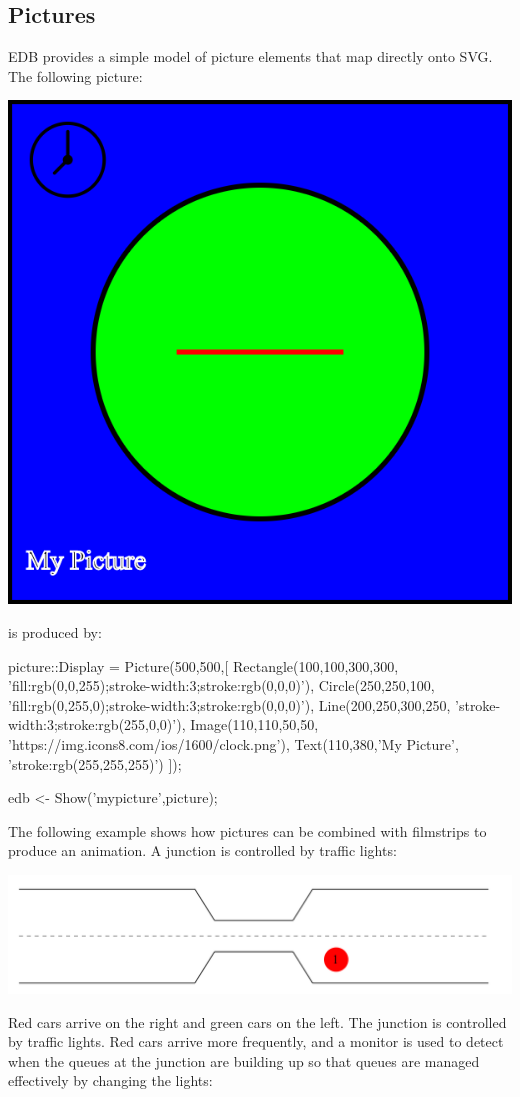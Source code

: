 \documentclass[5p,times]{elsarticle}
\begin{document}
\subsection{Pictures}

\label{sec:picture}

EDB provides a simple model of picture elements that map directly onto SVG. The following picture:
\begin{center}
\includegraphics[width=0.6\columnwidth]{picture}
\end{center}
is produced by:
\begin{ESL}
picture::Display = Picture(500,500,[
  Rectangle(100,100,300,300,
    'fill:rgb(0,0,255);stroke-width:3;stroke:rgb(0,0,0)'),
  Circle(250,250,100,
    'fill:rgb(0,255,0);stroke-width:3;stroke:rgb(0,0,0)'),
  Line(200,250,300,250,
    'stroke-width:3;stroke:rgb(255,0,0)'),
  Image(110,110,50,50,
    'https://img.icons8.com/ios/1600/clock.png'),
  Text(110,380,'My Picture',
    'stroke:rgb(255,255,255)')
]);

edb <- Show('mypicture',picture);
\end{ESL}
The following example shows how pictures can be combined with filmstrips to produce an animation. A junction is controlled by traffic lights:
\begin{center}
\includegraphics[width=\columnwidth]{traffic_start}
\end{center}
Red cars arrive on the right and green cars on the left. The junction is controlled by traffic lights. Red cars arrive more frequently, and a monitor is used to detect when the queues at the junction are building up so that queues are managed effectively by changing the lights:
\end{document}
